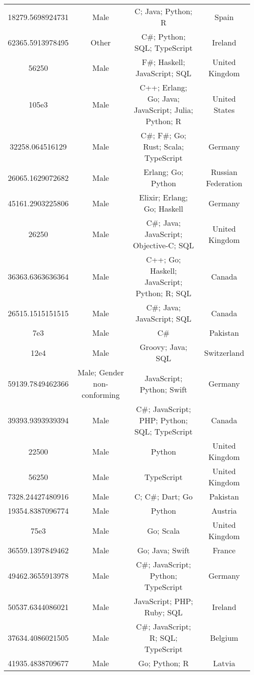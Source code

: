 \begin{center}
\begin{tabular}{ |c|c|c|c| }
18279.5698924731  &  Male  &  C; Java; Python; R  &  Spain  \\ 
62365.5913978495  &  Other  &  C\#; Python; SQL; TypeScript  &  Ireland  \\ 
56250  &  Male  &  F\#; Haskell; JavaScript; SQL  &  United Kingdom  \\ 
105e3  &  Male  &  C++; Erlang; Go; Java; JavaScript; Julia; Python; R  &  United States  \\ 
32258.064516129  &  Male  &  C\#; F\#; Go; Rust; Scala; TypeScript  &  Germany  \\ 
26065.1629072682  &  Male  &  Erlang; Go; Python  &  Russian Federation  \\ 
45161.2903225806  &  Male  &  Elixir; Erlang; Go; Haskell  &  Germany  \\ 
26250  &  Male  &  C\#; Java; JavaScript; Objective-C; SQL  &  United Kingdom  \\ 
36363.6363636364  &  Male  &  C++; Go; Haskell; JavaScript; Python; R; SQL  &  Canada  \\ 
26515.1515151515  &  Male  &  C\#; Java; JavaScript; SQL  &  Canada  \\ 
7e3  &  Male  &  C\#  &  Pakistan  \\ 
12e4  &  Male  &  Groovy; Java; SQL  &  Switzerland  \\ 
59139.7849462366  &  Male; Gender non-conforming  &  JavaScript; Python; Swift  &  Germany  \\ 
39393.9393939394  &  Male  &  C\#; JavaScript; PHP; Python; SQL; TypeScript  &  Canada  \\ 
22500  &  Male  &  Python  &  United Kingdom  \\ 
56250  &  Male  &  TypeScript  &  United Kingdom  \\ 
7328.24427480916  &  Male  &  C; C\#; Dart; Go  &  Pakistan  \\ 
19354.8387096774  &  Male  &  Python  &  Austria  \\ 
75e3  &  Male  &  Go; Scala  &  United Kingdom  \\ 
36559.1397849462  &  Male  &  Go; Java; Swift  &  France  \\ 
49462.3655913978  &  Male  &  C\#; JavaScript; Python; TypeScript  &  Germany  \\ 
50537.6344086021  &  Male  &  JavaScript; PHP; Ruby; SQL  &  Ireland  \\ 
37634.4086021505  &  Male  &  C\#; JavaScript; R; SQL; TypeScript  &  Belgium  \\ 
41935.4838709677  &  Male  &  Go; Python; R  &  Latvia  \\ 

\end{tabular}
\end{center}
